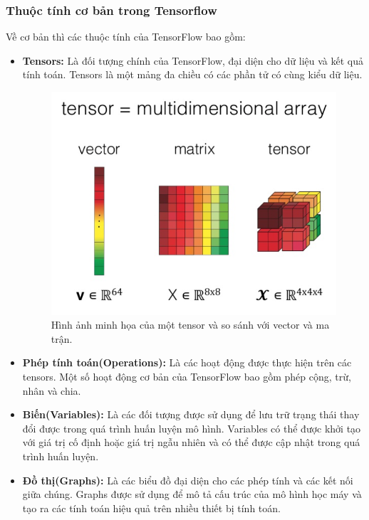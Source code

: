 \subsubsection{Thuộc tính cơ bản trong Tensorflow}
\indent Về cơ bản thì các thuộc tính của TensorFlow bao gồm:
\begin{itemize}
    \item \textbf{Tensors:} Là đối tượng chính của TensorFlow, đại diện cho dữ liệu và kết quả tính toán. Tensors là một mảng đa chiều có các phần tử có cùng kiểu dữ liệu.
    
    \begin{figure}[H]
        \centering
        \includegraphics[width=\textwidth,height=\textheight,keepaspectratio]{Images/Theoretical basis/tensor.png}
        \caption{Hình ảnh minh họa của một tensor và so sánh với vector và ma trận.}
        \label{fig:enter-label}
    \end{figure}
    \item \textbf{Phép tính toán(Operations):} Là các hoạt động được thực hiện trên các tensors. Một số hoạt động cơ bản của TensorFlow bao gồm phép cộng, trừ, nhân và chia.
    \item \textbf{Biến(Variables):} Là các đối tượng được sử dụng để lưu trữ trạng thái thay đổi được trong quá trình huấn luyện mô hình. Variables có thể được khởi tạo với giá trị cố định hoặc giá trị ngẫu nhiên và có thể được cập nhật trong quá trình huấn luyện.

    \item \textbf{Đồ thị(Graphs):} Là các biểu đồ đại diện cho các phép tính và các kết nối giữa chúng. Graphs được sử dụng để mô tả cấu trúc của mô hình học máy và tạo ra các tính toán hiệu quả trên nhiều thiết bị tính toán.


\end{itemize}
